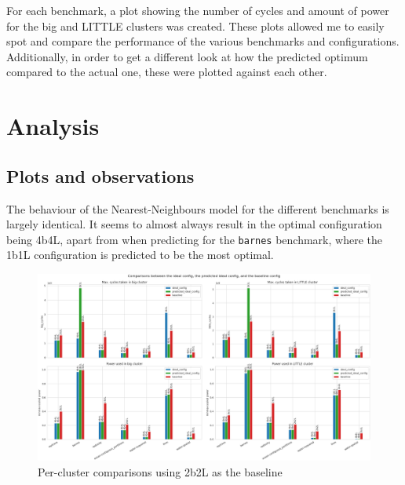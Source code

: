     For each benchmark, a plot showing the number of cycles and amount of power 
    for the big and LITTLE clusters was created. These plots allowed me to 
    easily spot and compare the performance of the various benchmarks and 
    configurations. Additionally, in order to get a different look at how the 
    predicted optimum compared to the actual one, these were plotted against 
    each other.
    
\section{Analysis}
    \subsection{Plots and observations}
    The behaviour of the Nearest-Neighbours model for the different benchmarks 
    is largely identical. It seems to almost always result in the optimal 
    configuration being 4b4L, apart from when predicting for the \texttt{barnes}
    benchmark, where the 1b1L configuration is predicted to be the most optimal.
    \begin{figure}[H]
        \centering
        \includegraphics[width=\textwidth]{result-plots/stock-2b2L/clusters-bars.png}
        \caption{Per-cluster comparisons using 2b2L as the baseline}
        \label{fig:clusters-bars}
    \end{figure}
    
